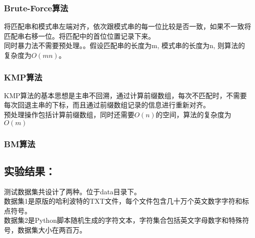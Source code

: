 \documentclass[UTF8]{ctexart}
\begin{document}
\subsubsection{Brute-Force算法}

将匹配串和模式串左端对齐，依次跟模式串的每一位比较是否一致，如果不一致将匹配串右移一位。将匹配中的首位位置记录下来。\\

同时暴力法不需要预处理。。假设匹配串的长度为m, 模式串的长度为n, 则算法的复杂度为$O(mn)$。

\subsubsection{KMP算法}

KMP算法的基本思想是主串不回溯，通过计算前缀数组，每次不匹配时，不需要每次回退主串的下标，而且通过前缀数组记录的信息进行重新对齐。\\

预处理操作包括计算前缀数组，同时还需要$O(n)$的空间，算法的复杂度为$O(m)$


\subsubsection{BM算法}


\subsection{实验结果：}

测试数据集共设计了两种。位于data目录下。\\

数据集1是原版的哈利波特的TXT文件，每个文件包含几十万个英文数字字符和标点符号。\\
数据集2是Python脚本随机生成的字符文本，字符集合包括英文字母数字和特殊符号，数据集大小在两百万。\\
\end{document}
